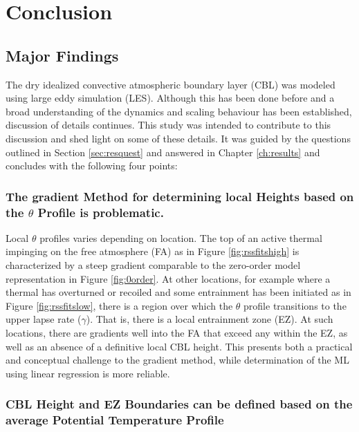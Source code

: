 
\chapter{Conclusion}
\label{ch:conc}
\setlength{\parindent}{0cm}

\section{Major Findings}

The dry idealized convective atmospheric boundary layer (\acs{CBL}) was modeled using large eddy simulation (\acs{LES}).  Although this has been done before and a broad understanding of the dynamics and scaling behaviour has been established, discussion of details continues.  This study was intended to contribute to this discussion and shed light on some of these details.  It was guided by the questions outlined in Section \ref{sec:resquest} and answered in Chapter \ref{ch:results} and concludes with the following four points:    


\subsection{The gradient Method for determining local Heights based on the $\theta$ Profile is problematic.}

Local $\theta$ profiles varies depending on location.  The top of an active thermal impinging on the free atmosphere (\acs{FA}) as in Figure \ref{fig:rssfitshigh} is characterized by a steep gradient comparable to the zero-order model representation in Figure \ref{fig:0order}.  At other locations, for example where a thermal has overturned or recoiled and some entrainment has been initiated as in Figure \ref{fig:rssfitslow}, there is a region over which the $\theta$ profile transitions to the upper lapse rate ($\gamma$). That is, there is a local entrainment zone (\acs{EZ}).  At such locations, there are gradients well into the \acs{FA} that exceed any within the \acs{EZ}, as well as an absence of a definitive local \acs{CBL} height.  This presents both a practical and conceptual challenge to the gradient method, while determination of the \acs{ML} using linear regression is more reliable. 

\subsection{\acs{CBL} Height and \acs{EZ} Boundaries can be defined based on the average Potential Temperature Profile}

